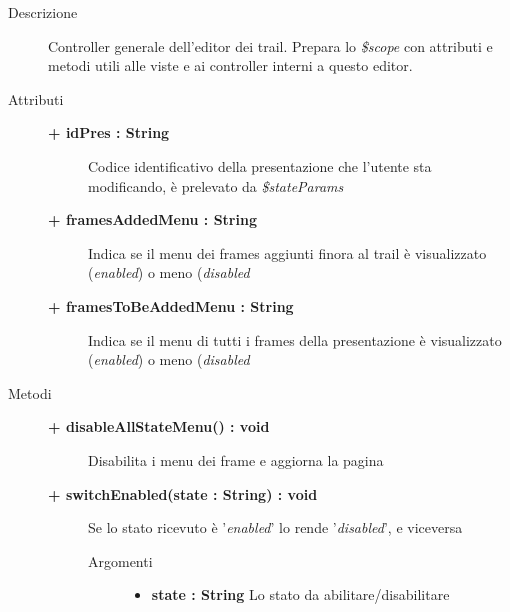 \begin{description}
\item[Descrizione] \hfill
	Controller generale dell'editor dei trail. Prepara lo \textit{\$scope} con attributi e metodi utili alle viste e ai controller interni a questo editor.
	
	
\item[Attributi] \hfill
	\begin{description}
		\item[\textbf{+ idPres : String			}] \hfill
			Codice identificativo della presentazione che l'utente sta modificando, è prelevato da \textit{\$stateParams}
		\item[\textbf{+ framesAddedMenu	: String		}] \hfill
			Indica se il menu dei frames aggiunti finora al trail è visualizzato (\textit{enabled}) o meno (\textit{disabled}
		\item[\textbf{+ framesToBeAddedMenu	: String		}] \hfill
			Indica se il menu di tutti i frames della presentazione è visualizzato (\textit{enabled}) o meno (\textit{disabled}
	\end{description}
	
	
\item[Metodi] \hfill

	\begin{description}
		\item[\textbf{\color{blue}+ disableAllStateMenu() : void			}] \hfill
			Disabilita i menu dei frame e aggiorna la pagina

	\end{description}
	
	\begin{description}
		\item[\textbf{\color{blue}+ switchEnabled(state : String) : void			}] \hfill
			Se lo stato ricevuto è '\textit{enabled}' lo rende '\textit{disabled}', e viceversa
			
		\begin{description}
			\item[Argomenti] \hfill
				\begin{itemize}
				
					\item \textbf{state : String			} \hfill
					Lo stato da abilitare/disabilitare
					
				\end{itemize}
		\end{description}
	\end{description}
	

\end{description}
